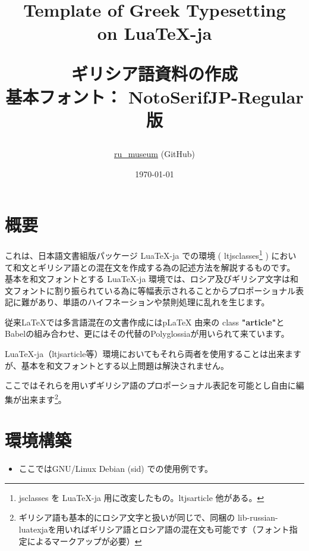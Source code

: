 \documentclass[a4paper,10pt]{ltjsarticle}
\title{
  \huge Template of Greek Typesetting\\ on Lua\TeX{}-ja\vspace{16mm} \par
  \Large{ギリシア語資料の作成}\vspace{6mm}\\
  \small{基本フォント： NotoSerifJP-Regular 版}
  \par\vspace{120mm}
}
\author{\href{https://github.com/ru-museum/}{ru\_museum} (GitHub)}
\date{\today}
\def\colH#1{\color[HTML]{#1}}
\begin{document}
\maketitle
\thispagestyle{empty}

\newpage
  
\tableofcontents
\thispagestyle{empty}

\newpage

\section{概要}

これは、日本語文書組版パッケージ {\colH{800000} LuaTeX-ja} での環境 ( {\colH{800000} ltjsclasses}\footnote{jsclasses を LuaTeX-ja 用に改変したもの。ltjsarticle 他がある。} ) において和文とギリシア語との混在文を作成する為の記述方法を解説するものです。\vspace{6pt}\\
基本を和文フォントとする LuaTeX-ja 環境では、ロシア及びギリシア文字は和文フォントに割り振られている為に{\gtfamily 等幅表示}されることから{\gtfamily プロポーショナル表記}に難があり、単語のハイフネーションや禁則処理に乱れを生じます。\vspace{6pt}\par

従来LaTeX{}では多言語混在の文書作成にはp\LaTeX{} 由来の class \textbf{"article"}と{\fRoboto\gtfamily Babel}の組み合わせ、更にはその代替の{\fRoboto\gtfamily Polyglossia}が用いられて来ています。\vspace{6pt}\par

LuaTeX-ja（ltjsarticle等）環境においてもそれら両者を使用することは出来ますが、基本を和文フォントとする以上問題は解決されません。\vspace{6pt}\par

ここではそれらを用いずギリシア語のプロポーショナル表記を可能とし自由に編集が出来ます\footnote{ギリシア語も基本的にロシア文字と扱いが同じで、同梱の{\colH{800000} lib-russian-luatexja}を用いればギリシア語とロシア語の混在文も可能です（フォント指定によるマークアップが必要）}。\vspace{-2mm}

\section{環境構築}
\vspace{-2mm}
\begin{itemize} 
  \item ここではGNU/Linux Debian (sid) での使用例です。\vspace{-4mm}
\end{itemize}
\end{document}
